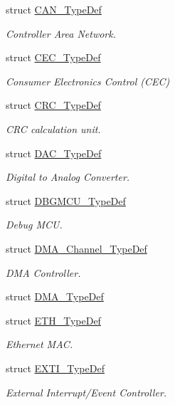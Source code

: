 \begin{DoxyCompactItemize}
struct \mbox{\hyperlink{struct_c_a_n___type_def}{C\+A\+N\+\_\+\+Type\+Def}}
\begin{DoxyCompactList}\small\item\em Controller Area Network. \end{DoxyCompactList}\item 
struct \mbox{\hyperlink{struct_c_e_c___type_def}{C\+E\+C\+\_\+\+Type\+Def}}
\begin{DoxyCompactList}\small\item\em Consumer Electronics Control (C\+EC) \end{DoxyCompactList}\item 
struct \mbox{\hyperlink{struct_c_r_c___type_def}{C\+R\+C\+\_\+\+Type\+Def}}
\begin{DoxyCompactList}\small\item\em C\+RC calculation unit. \end{DoxyCompactList}\item 
struct \mbox{\hyperlink{struct_d_a_c___type_def}{D\+A\+C\+\_\+\+Type\+Def}}
\begin{DoxyCompactList}\small\item\em Digital to Analog Converter. \end{DoxyCompactList}\item 
struct \mbox{\hyperlink{struct_d_b_g_m_c_u___type_def}{D\+B\+G\+M\+C\+U\+\_\+\+Type\+Def}}
\begin{DoxyCompactList}\small\item\em Debug M\+CU. \end{DoxyCompactList}\item 
struct \mbox{\hyperlink{struct_d_m_a___channel___type_def}{D\+M\+A\+\_\+\+Channel\+\_\+\+Type\+Def}}
\begin{DoxyCompactList}\small\item\em D\+MA Controller. \end{DoxyCompactList}\item 
struct \mbox{\hyperlink{struct_d_m_a___type_def}{D\+M\+A\+\_\+\+Type\+Def}}
\item 
struct \mbox{\hyperlink{struct_e_t_h___type_def}{E\+T\+H\+\_\+\+Type\+Def}}
\begin{DoxyCompactList}\small\item\em Ethernet M\+AC. \end{DoxyCompactList}\item 
struct \mbox{\hyperlink{struct_e_x_t_i___type_def}{E\+X\+T\+I\+\_\+\+Type\+Def}}
\begin{DoxyCompactList}\small\item\em External Interrupt/\+Event Controller. \end{DoxyCompactList}\item 

\end{DoxyCompactItemize}
